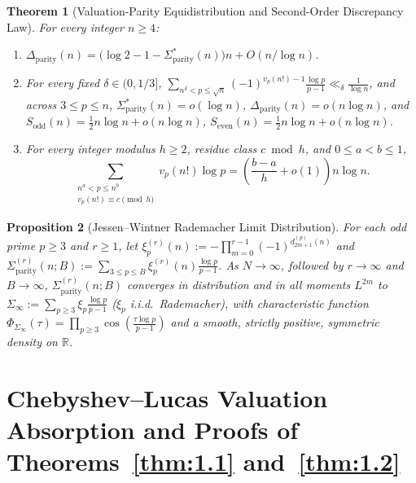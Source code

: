 \documentclass[11pt,reqno]{amsart}
\newtheorem{theorem}{Theorem}[section]
\newtheorem{proposition}[theorem]{Proposition}
\theoremstyle{remark}
\newcommand{\R}{\mathbb{R}}
\begin{document}
\begin{theorem}[Valuation-Parity Equidistribution and Second-Order Discrepancy Law]\label{thm:2.5}
For every integer $n \ge 4$:
\begin{enumerate}
\item[(i)] $\Delta_{\mathrm{parity}}(n) = \bigl(\log 2 - 1 - \Sigma^*_{\mathrm{parity}}(n)\bigr)n + O(n/\log n)$.
\item[(ii)] For every fixed $\delta \in (0, 1/3]$, $\sum_{n^\delta < p \le \sqrt{n}} (-1)^{v_p(n!)-1}\frac{\log p}{p-1} \ll_\delta \frac{1}{\log n}$, and across $3 \le p \le n$, $\Sigma^*_{\mathrm{parity}}(n) = o(\log n)$, $\Delta_{\mathrm{parity}}(n) = o(n\log n)$, and $S_{\mathrm{odd}}(n) = \frac{1}{2} n \log n + o(n\log n)$, $S_{\mathrm{even}}(n) = \frac{1}{2} n \log n + o(n\log n)$.
\item[(iii)] For every integer modulus $h \ge 2$, residue class $c \bmod h$, and $0 \le a < b \le 1$,
\begin{equation}\label{eq:multi-mod}
\sum_{\substack{n^a < p \le n^b \\ v_p(n!) \equiv c \pmod h}} v_p(n!)\log p = \left(\frac{b - a}{h} + o(1)\right) n \log n.
\end{equation}
\end{enumerate}
\end{theorem}

\begin{proposition}[Jessen--Wintner Rademacher Limit Distribution]\label{prop:2.6}
For each odd prime $p \ge 3$ and $r \ge 1$, let $\xi_p^{(r)}(n) := -\prod_{m=0}^{r-1} (-1)^{d_{2m+1}^{(p)}(n)}$ and $\Sigma_{\mathrm{parity}}^{(r)}(n; B) := \sum_{3 \le p \le B} \xi_p^{(r)}(n)\frac{\log p}{p-1}$. As $N \to \infty$, followed by $r \to \infty$ and $B \to \infty$, $\Sigma_{\mathrm{parity}}^{(r)}(n; B)$ converges in distribution and in all moments $L^{2m}$ to $\Sigma_\infty := \sum_{p \ge 3} \xi_p \frac{\log p}{p-1}$ ($\xi_p$ i.i.d.\ Rademacher), with characteristic function $\Phi_{\Sigma_\infty}(\tau) = \prod_{p \ge 3}\cos(\frac{\tau \log p}{p-1})$ and a smooth, strictly positive, symmetric density on $\R$.
\end{proposition}

\section{Chebyshev--Lucas Valuation Absorption and Proofs of Theorems~\ref{thm:1.1} and~\ref{thm:1.2}}
\end{document}
